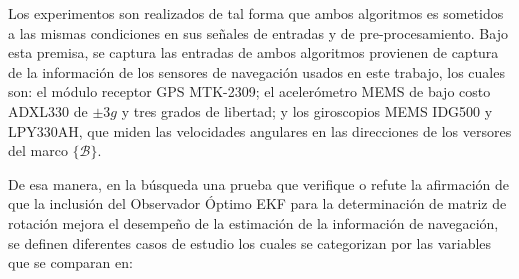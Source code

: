\documentclass[conference]{IEEEtran}
\newcommand{\marco}[1]{\{\mathcal{#1}\}}
\begin{document}
Los experimentos son realizados de tal forma que ambos algoritmos es sometidos a las mismas condiciones en sus señales de entradas y de pre-procesamiento. Bajo esta premisa, se captura las entradas de ambos algoritmos provienen de captura de la información de los sensores de navegación usados en este trabajo, los cuales son: el módulo receptor GPS MTK-2309; el acelerómetro MEMS de bajo costo ADXL330 de $\pm3g$ y tres grados de libertad; y los giroscopios MEMS IDG500 y LPY330AH, que miden las velocidades angulares en las direcciones de los versores del marco $\marco{B}$. \par
De esa manera, en la búsqueda una prueba que verifique o refute la afirmación de que la inclusión del Observador Óptimo EKF para la determinación de matriz de rotación mejora el desempeño de la estimación de la información de navegación, se definen diferentes casos de estudio los cuales se categorizan por las variables que se comparan en: 
\end{document}
